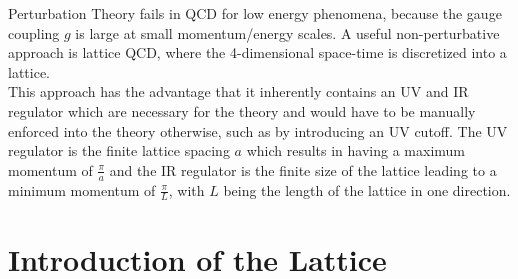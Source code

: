 Perturbation Theory fails in QCD for low energy phenomena, because the gauge coupling $g$ is large at small momentum/energy scales. A useful non-perturbative approach is lattice QCD, where the 4-dimensional space-time is discretized into a lattice. \\
This approach has the advantage that it inherently contains an UV and IR regulator which are necessary for the theory and would have to be manually enforced into the theory otherwise, such as by introducing an UV cutoff. The UV regulator is the finite lattice spacing $a$ which results in having a maximum momentum of $\frac{\pi}{a}$ and the IR regulator is the finite size of the lattice leading to a minimum momentum of $\frac{\pi}{L}$, with $L$ being the length of the lattice in one direction. 


\section{Introduction of the Lattice}

